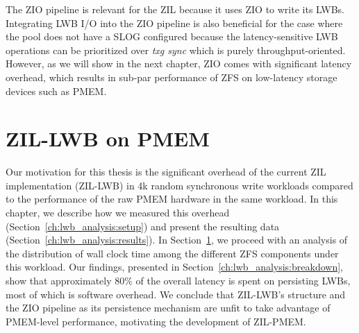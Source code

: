 \documentclass[12pt,a4paper,twoside]{book}
\begin{document}
The ZIO pipeline is relevant for the ZIL because it uses ZIO to write its LWBs.
Integrating LWB I/O into the ZIO pipeline is also beneficial for the case where the pool does not have a SLOG configured because the latency-sensitive LWB operations can be prioritized over \textit{txg sync} which is purely throughput-oriented.
However, as we will show in the next chapter, ZIO comes with significant latency overhead, which results in sub-par performance of ZFS on low-latency storage devices such as PMEM.

\chapter{ZIL-LWB on PMEM}\label{ch:lwb_analysis}
Our motivation for this thesis is the significant overhead of the current ZIL implementation (ZIL-LWB) in 4k random synchronous write workloads compared to the performance of the raw PMEM hardware in the same workload.
In this chapter, we describe how we measured this overhead (Section~\ref{ch:lwb_analysis:setup}) and present the resulting data (Section~\ref{ch:lwb_analysis:results}).
In Section~\ref{ch:lwb_analysis}, we proceed with an analysis of the distribution of wall clock time among the different ZFS components under this workload.
Our findings, presented in Section~\ref{ch:lwb_analysis:breakdown}, show that approximately 80\% of the overall latency is spent on persisting LWBs, most of which is software overhead.
We conclude that ZIL-LWB's structure and the ZIO pipeline as its persistence mechanism are unfit to take advantage of PMEM-level performance, motivating the development of ZIL-PMEM.
\end{document}
